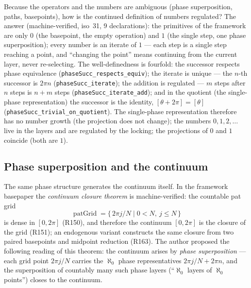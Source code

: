 \documentclass{article}
\begin{document}
Because the operators and the numbers are ambiguous (phase
superposition, paths, basepoints), how is the continued definition of
numbers regulated? The answer (machine-verified, iso~31, 9
declarations): the primitives of the framework are only $0$ (the
basepoint, the empty operation) and $1$ (the single step, one phase
superposition); every number is an iterate of $1$ --- each step is a
single step reaching a point, and ``changing the point'' means
continuing from the current layer, never re-selecting. The
well-definedness is fourfold: the successor respects phase equivalence
(\texttt{phaseSucc\_respects\_equiv}); the iterate is unique --- the
$n$-th successor is $2\pi n$ (\texttt{phaseSucc\_iterate}); the
addition is regulated --- $m$ steps after $n$ steps is $n+m$ steps
(\texttt{phaseSucc\_iterate\_add}); and in the quotient (the
single-phase representation) the successor is the identity,
$[\theta+2\pi]=[\theta]$ (\texttt{phaseSucc\_trivial\_on\_quotient}).
The single-phase representation therefore has no number growth (the
projection does not change); the numbers $0,1,2,\dots$ live in the
layers and are regulated by the locking; the projections of $0$ and $1$
coincide (both are $1$).

\subsection*{Phase superposition and the continuum}

The same phase structure generates the continuum itself. In the framework
basepaper \cite{patbase} the \emph{continuum closure theorem} is
machine-verified: the countable pat grid
\[
\operatorname{patGrid}=\{\,2\pi j/N \mid 0<N,\ j\le N\,\}
\]
is dense in $[0,2\pi]$ (R150), and therefore the continuum $[0,2\pi]$ is
the closure of the grid (R151); an endogenous variant constructs the same
closure from two paired basepoints and midpoint reduction (R163). The
author proposed the following reading of this theorem: the continuum
arises by \emph{phase superposition} --- each grid point $2\pi j/N$
carries the $\aleph_0$ phase representatives $2\pi j/N+2\pi n$, and the
superposition of countably many such phase layers (``$\aleph_0$ layers of
$\aleph_0$ points'') closes to the continuum.
\end{document}
